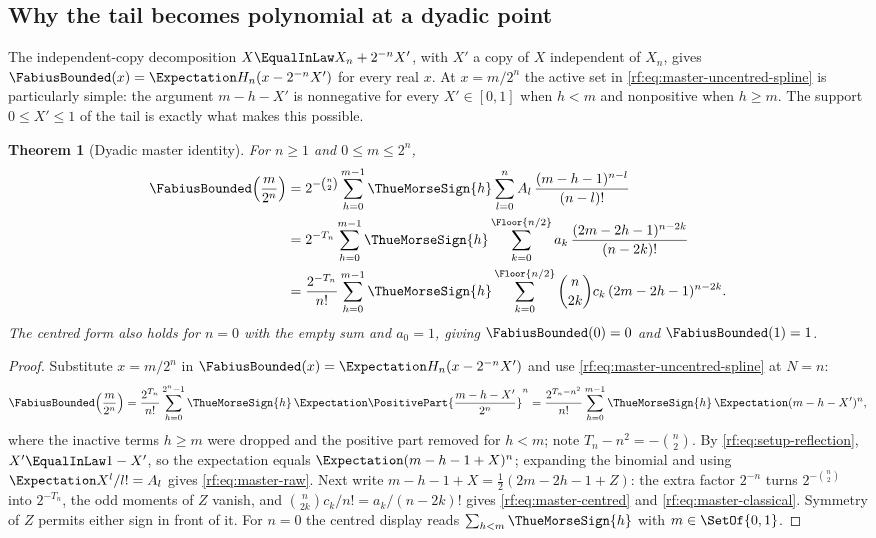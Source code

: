 \documentclass[11pt,oneside]{article}
\theoremstyle{plain}
\newtheorem{theorem}{Theorem}[section]
\theoremstyle{definition}
\theoremstyle{remark}
\newcommand{\Fb}{\FabiusBounded}            %
\newcommand{\tm}[1]{\ThueMorseSign{#1}}     %
\newcommand{\E}{\Expectation}
\newcommand{\Tr}[1]{T_{#1}}                 %
\begin{document}
\subsection{Why the tail becomes polynomial at a dyadic point}
\label{rf:sec:master-identity}

The independent-copy decomposition $X\EqualInLaw X_{n}+2^{-n}X'$, with $X'$
a copy of $X$ independent of $X_{n}$, gives
$\Fb(x)=\E H_{n}(x-2^{-n}X')$ for every real $x$.  At $x=m/2^{n}$ the active
set in \cref{rf:eq:master-uncentred-spline} is particularly simple: the
argument $m-h-X'$ is nonnegative for every $X'\in[0,1]$ when $h<m$ and
nonpositive when $h\ge m$.  The support $0\le X'\le1$ of the tail is exactly
what makes this possible.

\begin{theorem}[Dyadic master identity]
\label{rf:thm:master}
For $n\ge1$ and $0\le m\le2^{n}$,
\begin{align}
 \Fb\!\left(\frac{m}{2^{n}}\right)
 &=2^{-\binom{n}{2}}\sum_{h=0}^{m-1}\tm{h}
   \sum_{l=0}^{n}A_{l}\,\frac{(m-h-1)^{n-l}}{(n-l)!}
 \label{rf:eq:master-raw}\\
 &=2^{-\Tr{n}}\sum_{h=0}^{m-1}\tm{h}
   \sum_{k=0}^{\Floor{n/2}}a_{k}\,\frac{(2m-2h-1)^{n-2k}}{(n-2k)!}
 \label{rf:eq:master-centred}\\
 &=\frac{2^{-\Tr{n}}}{n!}\sum_{h=0}^{m-1}\tm{h}
   \sum_{k=0}^{\Floor{n/2}}\binom{n}{2k}c_{k}\,(2m-2h-1)^{n-2k}.
 \label{rf:eq:master-classical}
\end{align}
The centred form also holds for $n=0$ with the empty sum and $a_{0}=1$,
giving $\Fb(0)=0$ and $\Fb(1)=1$.
\end{theorem}

\begin{proof}
Substitute $x=m/2^{n}$ in $\Fb(x)=\E H_{n}(x-2^{-n}X')$ and use
\cref{rf:eq:master-uncentred-spline} at $N=n$:
\[
 \Fb\!\left(\frac{m}{2^{n}}\right)
 =\frac{2^{\Tr{n}}}{n!}\sum_{h=0}^{2^{n}-1}\tm{h}\,
  \E\PositivePart{\frac{m-h-X'}{2^{n}}}^{n}
 =\frac{2^{\Tr{n}-n^{2}}}{n!}\sum_{h=0}^{m-1}\tm{h}\,
  \E(m-h-X')^{n},
\]
where the inactive terms $h\ge m$ were dropped and the positive part removed
for $h<m$; note $\Tr{n}-n^{2}=-\binom{n}{2}$.  By
\cref{rf:eq:setup-reflection}, $X'\EqualInLaw1-X'$, so the expectation
equals $\E(m-h-1+X)^{n}$; expanding the binomial and using
$\E X^{l}/l!=A_{l}$ gives \cref{rf:eq:master-raw}.  Next write
$m-h-1+X=\tfrac12(2m-2h-1+Z)$: the extra factor $2^{-n}$ turns
$2^{-\binom{n}{2}}$ into $2^{-\Tr{n}}$, the odd moments of $Z$ vanish, and
$\binom{n}{2k}c_{k}/n!=a_{k}/(n-2k)!$ gives \cref{rf:eq:master-centred} and
\cref{rf:eq:master-classical}.  Symmetry of $Z$ permits either sign in front
of it.  For $n=0$ the centred display reads $\sum_{h<m}\tm{h}$ with
$m\in\SetOf{0,1}$.
\end{proof}
\end{document}
